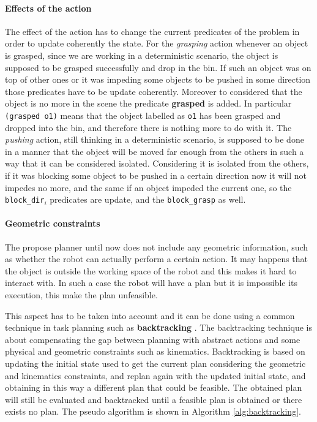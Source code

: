 \paragraph{Effects of the action}
The effect of the action has to change the current predicates of the problem in order to update coherently the state. For the \textit{grasping} action whenever an object is grasped, since we are working in a deterministic scenario, the object is supposed to be grasped successfully and drop in the bin. If such an object was on top of other ones or it was impeding some objects to be pushed in some direction those predicates have to be update coherently. Moreover to considered that the object is no more in the scene the predicate \textbf{grasped} is added. In particular \texttt{(grasped o1)} means that the object labelled as \texttt{o1} has been grasped and dropped into the bin, and therefore there is nothing more to do with it. The \textit{pushing} action, still thinking in a deterministic scenario, is supposed to be done in a manner that the object will be moved far enough from the others in such a way that it can be considered isolated. Considering it is isolated from the others, if it was blocking some object to be pushed in a certain direction now it will not impedes no more, and the same if an object impeded the current one, so the \texttt{block\_dir}$_i$ predicates are update, and the \texttt{block\_grasp} as well.  

	
\paragraph{Geometric constraints}
The propose planner until now does not include any geometric information, such as whether the robot can actually perform a certain action. It may happens that the object is outside the working space of the robot and this makes it hard to interact with. In such a case the robot will have a plan but it is impossible its execution, this make the plan unfeasible. 

This aspect has to be taken into account and it can be done using a common technique in task planning such as \textbf{backtracking} \citep{Bidot2015}. The backtracking technique is about compensating the gap between planning with abstract actions and some physical and geometric constraints such as kinematics. Backtracking is based on updating the initial state used to get the current plan considering the geometric and kinematics constraints, and replan again with the updated initial state, and obtaining in this way a different plan that could be feasible. The obtained plan will still be evaluated and backtracked until a feasible plan is obtained or there exists no plan. The pseudo algorithm is shown in Algorithm \ref{alg:backtracking}.

